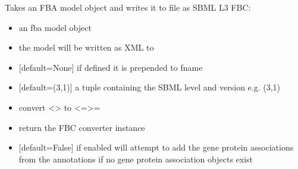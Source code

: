 \documentclass[letterpaper,10pt,english]{sphinxmanual}
\begin{document}
\begin{fulllineitems}
\label{\detokenize{modules_doc:cbmpy.CBXML.sbml_writeSBML3FBC}}
\pysigstartsignatures
{}
\pysigstopsignatures
\sphinxAtStartPar
Takes an FBA model object and writes it to file as SBML L3 FBC:
\begin{itemize}
\item {} 
\sphinxAtStartPar
{} an fba model object

\item {} 
\sphinxAtStartPar
{} the model will be written as XML to 

\item {} 
\sphinxAtStartPar
{} {[}default=None{]} if defined it is prepended to fname

\item {} 
\sphinxAtStartPar
{} {[}default=(3,1){]} a tuple containing the SBML level and version e.g. (3,1)

\item {} 
\sphinxAtStartPar
{} convert \textless{}\textgreater{} to \textless{}=\textgreater{}=

\item {} 
\sphinxAtStartPar
{} return the FBC converter instance

\item {} 
\sphinxAtStartPar
{} {[}default=False{]} if enabled will attempt to add the gene protein associations from the annotations
if no gene protein association objects exist


\end{itemize}
\end{fulllineitems}
\end{document}
